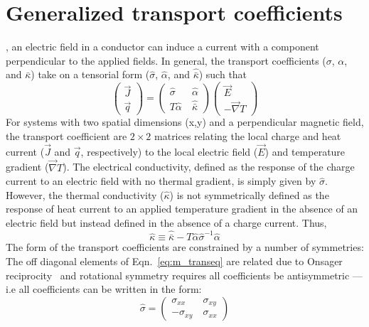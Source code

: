 \section{Generalized transport coefficients}
, an electric field in a conductor can induce a current with a component perpendicular to the applied fields. In general, the transport coefficients ($\sigma$, $\alpha$, and $\bar\kappa$) take on a tensorial form ($\hat\sigma$, $\hat\alpha$, and $\hat{\bar\kappa}$) such that
\begin{equation}
\left( \begin{array}{c} \vec J  \\ \vec q \end{array}\right) =  \left( \begin{array}{cc} \hat\sigma   &\  \hat\alpha \\  T\hat\alpha   &\ \hat{\bar\kappa}  \end{array}\right)\left( \begin{array}{c}  \vec E \\  -\vec\nabla T  \end{array}\right)   \label{eq:m_transeq}
\end{equation}
For systems with two spatial dimensions (x,y) and a perpendicular magnetic field, the transport coefficient are $2\times 2$ matrices relating the local charge and heat current ($\vec J$ and $\vec q$, respectively) to the local electric field ($\vec E$) and temperature gradient ($\vec\nabla T$). The electrical conductivity, defined as the response of the charge current to an electric field with no thermal gradient, is simply given by $\hat\sigma$. However, the thermal conductivity ($\hat\kappa$) is not symmetrically defined as the response of heat current to an applied temperature gradient in the absence of an electric field but instead defined in the absence of a charge current. Thus,
\begin{equation}
\hat\kappa \equiv \hat{\bar\kappa}-T\hat\alpha\hat\sigma^{-1}\hat\alpha
\end{equation}
The form of the transport coefficients are constrained by a number of symmetries: The off diagonal elements of Eqn.~\ref{eq:m_transeq} are related due to Onsager reciprocity~\cite{mazur_onsagers_1953, smrcka_transport_1977} and rotational symmetry requires all coefficients be antisymmetric --- i.e all coefficients can be written in the form:
\begin{equation}
\hat\sigma=\left( \begin{array}{cc} \sigma_{xx}  &\  \sigma_{xy} \\ -\sigma_{xy}  &\ \sigma_{xx} \end{array}\right)
\end{equation}

